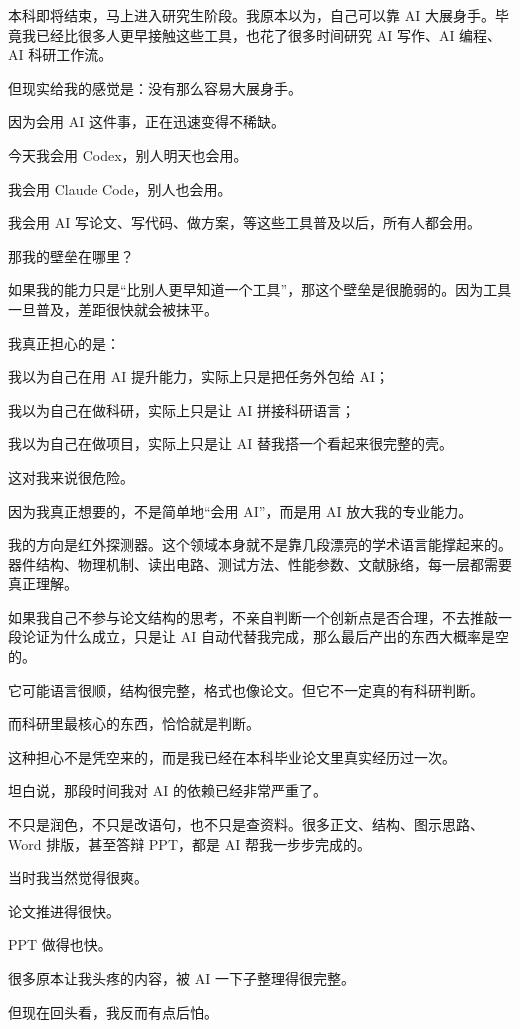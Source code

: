 \documentclass[UTF8,zihao=-4,a4paper]{ctexart}
\begin{document}
本科即将结束，马上进入研究生阶段。我原本以为，自己可以靠 AI 大展身手。毕竟我已经比很多人更早接触这些工具，也花了很多时间研究 AI 写作、AI 编程、AI 科研工作流。

但现实给我的感觉是：没有那么容易大展身手。

因为会用 AI 这件事，正在迅速变得不稀缺。

今天我会用 Codex，别人明天也会用。\par
我会用 Claude Code，别人也会用。\par
我会用 AI 写论文、写代码、做方案，等这些工具普及以后，所有人都会用。

那我的壁垒在哪里？

如果我的能力只是“比别人更早知道一个工具”，那这个壁垒是很脆弱的。因为工具一旦普及，差距很快就会被抹平。

我真正担心的是：

我以为自己在用 AI 提升能力，实际上只是把任务外包给 AI；\par
我以为自己在做科研，实际上只是让 AI 拼接科研语言；\par
我以为自己在做项目，实际上只是让 AI 替我搭一个看起来很完整的壳。

这对我来说很危险。

因为我真正想要的，不是简单地“会用 AI”，而是用 AI 放大我的专业能力。

我的方向是红外探测器。这个领域本身就不是靠几段漂亮的学术语言能撑起来的。器件结构、物理机制、读出电路、测试方法、性能参数、文献脉络，每一层都需要真正理解。

如果我自己不参与论文结构的思考，不亲自判断一个创新点是否合理，不去推敲一段论证为什么成立，只是让 AI 自动代替我完成，那么最后产出的东西大概率是空的。

它可能语言很顺，结构很完整，格式也像论文。但它不一定真的有科研判断。

而科研里最核心的东西，恰恰就是判断。

这种担心不是凭空来的，而是我已经在本科毕业论文里真实经历过一次。

坦白说，那段时间我对 AI 的依赖已经非常严重了。

不只是润色，不只是改语句，也不只是查资料。很多正文、结构、图示思路、Word 排版，甚至答辩 PPT，都是 AI 帮我一步步完成的。

当时我当然觉得很爽。

论文推进得很快。\par
PPT 做得也快。\par
很多原本让我头疼的内容，被 AI 一下子整理得很完整。

但现在回头看，我反而有点后怕。
\end{document}
